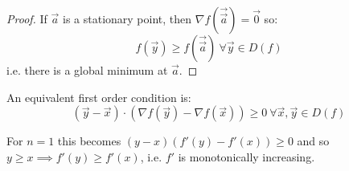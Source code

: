 \documentclass[../main.tex]{subfiles}
\begin{document}
\begin{proof}
  If $\vec{a}$ is a stationary point, then $\nabla f(\vec{\vec{a}}) = \vec{0}$ so:
  \[
    f(\vec{y}) \geq f(\vec{\vec{a}})\ \forall \vec{y} \in D(f)
  \]
  i.e. there is a global minimum at $\vec{a}$.
\end{proof}
\begin{proposition}
  An equivalent first order condition is: \label{altFirstOrderCond}
  \begin{equation}
    (\vec{y} - \vec{x}) \cdot (\nabla f(\vec{y}) - \nabla f(\vec{x})) \geq 0\ \forall \vec{x}, \vec{y} \in D(f) \label{equiv1stEqn}
  \end{equation}
\end{proposition}
\begin{remark}
  For $n = 1$ this becomes $(y - x)(f'(y) - f'(x)) \geq 0$ and so $y \geq x \implies f'(y) \geq f'(x)$, i.e. $f'$ is monotonically increasing.
\end{remark}
\end{document}
